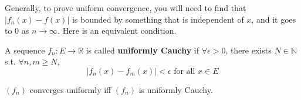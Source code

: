   Generally, to prove uniform convergence, you will need to find that $|f_n (x) - f(x)|$ is bounded by something that is independent of $x$, and it goes to $0$ as $n \to \infty$. Here is an equivalent condition. 

  \begin{definition}
    A sequence $f_n: E \to \mathbb{R}$ is called \textbf{uniformly Cauchy} if $\forall \epsilon > 0$, there exists $N \in \mathbb{N}$ s.t. $\forall n, m \geq N$, 
    \begin{equation}
      |f_n (x) - f_m (x)| < \epsilon \text{ for all } x \in E
    \end{equation}
  \end{definition}

  \begin{lemma}
    $(f_n)$ converges uniformly iff $(f_n)$ is uniformly Cauchy. 
  \end{lemma}
